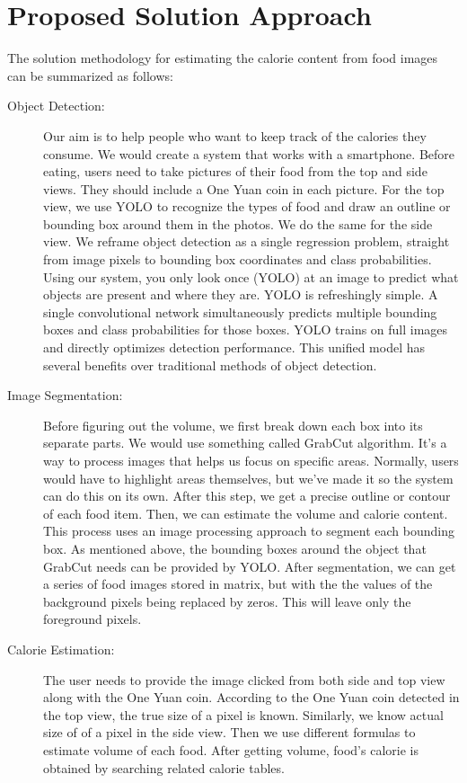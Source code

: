 \documentclass[12pt, a4paper, twoside]{article}
\begin{document}
	\section{Proposed Solution Approach}
	The solution methodology for estimating the calorie content from food images can be summarized as follows:
	\begin{description}
		\item[Object Detection:] Our aim is to help people who want to keep track of the calories they consume. We would create a system that works with a smartphone. Before eating, users need to take pictures of their food from the top and side views. They should include a One Yuan coin in each picture. For the top view, we use YOLO to recognize the types of food and draw an outline or bounding box around them in the photos. We do the same for the side view. We reframe object detection as a single regression problem, straight from image pixels to bounding box coordinates and class probabilities. Using our system, you only
		look once (YOLO) at an image to predict what objects are
		present and where they are. YOLO is refreshingly simple. A single convolutional network simultaneously predicts multiple bounding boxes and class probabilities for those boxes. YOLO trains on full images and directly optimizes detection performance. This unified model has several benefits over traditional methods of object detection.
		
		\item[Image Segmentation:] Before figuring out the volume, we first break down each box into its separate parts. We would use something called GrabCut algorithm. It's a way to process images that helps us focus on specific areas. Normally, users would have to highlight areas themselves, but we've made it so the system can do this on its own. After this step, we get a precise outline or contour of each food item. Then, we can estimate the volume and calorie content. This process uses an image processing approach to segment each bounding box. As mentioned above, the bounding boxes around the object that GrabCut needs can be provided by YOLO. After segmentation, we can get a series of food images stored in matrix, but with the the values of the background pixels being replaced by zeros. This will leave only the foreground pixels.
		
		\item[Calorie Estimation:] The user needs to provide the image clicked from both side and top view along with the One Yuan coin. According to the One Yuan coin detected in the top view, the true size of a pixel is known. Similarly, we know actual size of of a pixel in the side view. Then we use different formulas to estimate volume of each food. After getting volume, food’s calorie is obtained by searching related calorie tables. 
	\end{description}
	
\end{document}
